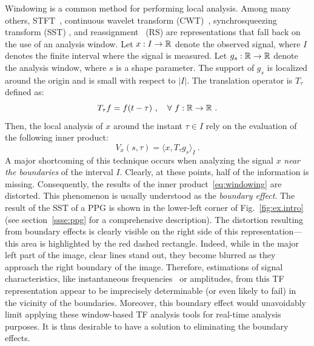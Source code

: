 \documentclass[journal]{IEEEtran}
\begin{document}
Windowing is a common method for performing local analysis. Among many others, STFT~\cite{Flandrin:1999}, continuous wavelet transform (CWT)~\cite{Da1992}, synchrosqueezing transform (SST) \cite{Daubechies11synchrosqueezed}, and reassignment~\cite{Auger13time} (RS) are representations that fall back on the use of an analysis window. Let $x:I\to{\mathbb R}$ denote the observed signal, where $I$ denotes the finite interval where the signal is measured. Let $g_s:{\mathbb R}\to{\mathbb R}$ denote the analysis window, where $s$ is a shape parameter. The support of $g_s$ is localized around the origin and is small with respect to $|I|$. The translation operator is $T_\tau$ defined as:
\[
T_\tau f = f(t-\tau)\ ,\quad \forall\ f:{\mathbb R}\to{\mathbb R}\ .
\]
Then, the local analysis of $x$ around the instant $\tau\in I$ rely on the evaluation of the following inner product:
\begin{equation}
V_x(s,\tau) = \langle x, T_\tau g_s \rangle_I \ .
\label{eq:windowing}
\end{equation}
A major shortcoming of this technique occurs when analyzing the signal $x$ {\em near the boundaries} of the interval $I$. Clearly, at these points, half of the information is missing. Consequently, the results of the inner product~\eqref{eq:windowing} are distorted. This phenomenon is usually understood as the \emph{boundary effect}. The result of the SST of a PPG is shown in the lower-left corner of Fig.~\ref{fig:ex.intro} (see section~\ref{ssse:ppg} for a comprehensive description). The distortion resulting from boundary effects is clearly visible on the right side of this representation---this area is highlighted by the red dashed rectangle. Indeed, while in the major left part of the image, clear lines stand out, they become blurred as they approach the right boundary of the image. Therefore, estimations of signal characteristics, like instantaneous frequencies~\cite{Delprat92asymptotic} or amplitudes, from this TF representation appear to be imprecisely determinable (or even likely to fail) in the vicinity of the boundaries. Moreover, this boundary effect would unavoidably limit applying these window-based TF analysis tools for real-time analysis purposes. It is thus desirable to have a solution to eliminating the boundary effects.
\end{document}
